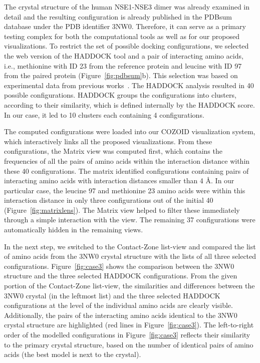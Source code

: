 \documentclass[twocolumn]{bmcart}%
\def\MatView {Matrix view\xspace}
\def\CoZoListView {Contact-Zone list-view\xspace}
\begin{document}
The crystal structure of the human NSE1-NSE3 dimer was already examined in detail and the resulting configuration is already published in the PDBsum database under the PDB identifier 3NW0. 
Therefore, it can serve as a primary testing complex for both the computational tools as well as for our proposed visualizations.
To restrict the set of possible docking configurations, we selected the web version of the HADDOCK tool and a pair of interacting amino acids, i.e., methionine with ID 23 from the reference protein and leucine with ID 97 from the paired protein (Figure~\ref{fig:pdbsum}b).
This selection was based on experimental data from previous works~\cite{Doyle2010,Hudson2011,Kozakova,Crabben}.
The HADDOCK analysis resulted in 40 possible configurations.
HADDOCK groups the configurations into clusters, according to their similarity, which is defined internally by the HADDOCK score.
In our case, it led to 10 clusters each containing 4 configurations.

The computed configurations were loaded into our COZOID visualization system, which interactively links all the proposed visualizations.
From these configurations, the \MatView was computed first, which contains the frequencies of all the pairs of amino acids within the interaction distance within these 40 configurations.
The matrix identified configurations containing pairs of interacting amino acids with interaction distances smaller than 4 \AA.
In our particular case, the leucine 97 and methionine 23 amino acids were within this interaction distance in only three configurations out of the initial 40 (Figure~\ref{fig:matrixlens}). 
The Matrix view helped to filter these immediately through a simple interaction with the view. 
The remaining 37 configurations were automatically hidden in the remaining views.

In the next step, we switched to the \CoZoListView and compared the list of amino acids from the 3NW0 crystal structure with the lists of all three selected configurations.
Figure~\ref{fig:case3} shows the comparison between the 3NW0 structure and the three selected HADDOCK configurations.
From the given portion of the \CoZoListView, the similarities and differences between the 3NW0 crystal (in the leftmost list) and the three selected HADDOCK configurations at the level of the individual amino acids are clearly visible.
Additionally, the pairs of the interacting amino acids identical to the 3NW0 crystal structure are highlighted (red lines in Figure~\ref{fig:case3}). 
The left-to-right order of the modelled configurations in Figure~\ref{fig:case3} reflects their similarity to the primary crystal structure, based on the number of identical pairs of amino acids (the best model is next to the crystal).
\end{document}
